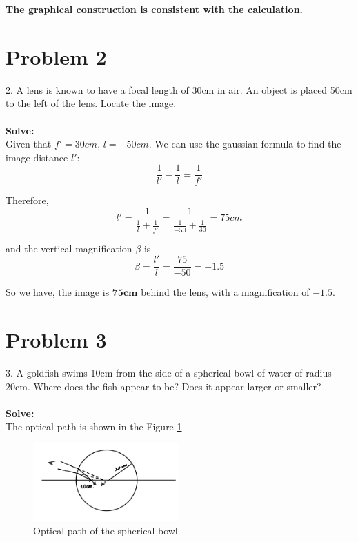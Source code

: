 \documentclass{article}
\begin{document}
\textbf{The graphical construction is consistent with the calculation.}

\section{Problem 2}

2. A lens is known to have a focal length of 30cm in air. An object is placed 50cm to the left of the lens. Locate the image.\\\\
\textbf{Solve:}\\

Given that $f' = 30cm$, $l = -50cm$. We can use the gaussian formula to find the image distance $l'$:
\begin{equation}
    \frac{1}{l'}-\frac{1}{l} = \frac{1}{f'}
\end{equation}

Therefore,
\begin{equation}
    \boxed{
        l' = \frac{1}{\frac{1}{l} + \frac{1}{f'}} = \frac{1}{\frac{1}{-50} + \frac{1}{30}} = 75cm
    }
\end{equation}

and the vertical magnification $\beta$ is
\begin{equation}
    \beta = \frac{l'}{l} = \frac{75}{-50} = -1.5
\end{equation}

So we have, the image is $\mathbf{75cm}$ behind the lens, with a magnification of $\mathbf{-1.5}$.

\section{Problem 3}
3. A goldfish swims 10cm from the side of a spherical bowl of water of radius 20cm. Where does the fish appear to be?
Does it appear larger or smaller?\\\\
\textbf{Solve:}\\

The optical path is shown in the Figure \ref{fig:hw2e_3}.
\begin{figure}[H]
    \centering
    \includegraphics[width=0.5\textwidth]{./image/hw2/hw2e_3.jpeg}
    \caption{Optical path of the spherical bowl}
    \label{fig:hw2e_3}
\end{figure}
\end{document}
